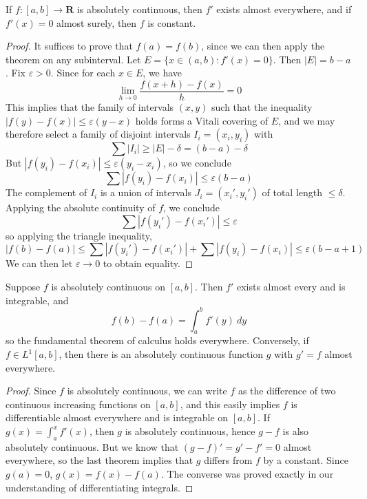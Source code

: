 \begin{theorem}
    If $f: [a,b] \to \mathbf{R}$ is absolutely continuous, then $f'$ exists almost everywhere, and if $f'(x) = 0$ almost surely, then $f$ is constant.
\end{theorem}
\begin{proof}
    It suffices to prove that $f(a) = f(b)$, since we can then apply the theorem on any subinterval. Let $E = \{ x \in (a,b): f'(x) = 0 \}$. Then $|E| = b - a$. Fix $\varepsilon > 0$. Since for each $x \in E$, we have
    \[ \lim_{h \to 0} \frac{f(x+h) - f(x)}{h} = 0 \]
    This implies that the family of intervals $(x,y)$ such that the inequality $|f(y) - f(x)| \leq \varepsilon (y-x)$ holds forms a Vitali covering of $E$, and we may therefore select a family of disjoint intervals $I_i = (x_i,y_i)$ with
    \[ \sum |I_i| \geq |E| - \delta = (b - a) - \delta \]
    But $|f(y_i) - f(x_i)| \leq \varepsilon (y_i - x_i)$, so we conclude
    \[ \sum |f(y_i) - f(x_i)| \leq \varepsilon (b - a) \]
    The complement of $I_i$ is a union of intervals $J_i = (x_i',y_i')$ of total length $\leq \delta$. Applying the absolute continuity of $f$, we conclude
    \[ \sum |f(y_i') - f(x_i')| \leq \varepsilon \]
    so applying the triangle inequality,
    \[ |f(b) - f(a)| \leq \sum |f(y_i') - f(x_i')| + \sum |f(y_i) - f(x_i)| \leq \varepsilon(b - a + 1) \]
    We can then let $\varepsilon \to 0$ to obtain equality.
\end{proof}

\begin{theorem}
    Suppose $f$ is absolutely continuous on $[a,b]$. Then $f'$ exists almost every and is integrable, and
    \[ f(b) - f(a) = \int_a^b f'(y)\ dy \]
    so the fundamental theorem of calculus holds everywhere. Conversely, if $f \in L^1[a,b]$, then there is an absolutely continuous function $g$ with $g' = f$ almost everywhere.
\end{theorem}
\begin{proof}
    Since $f$ is absolutely continuous, we can write $f$ as the difference of two continuous increasing functions on $[a,b]$, and this easily implies $f$ is differentiable almost everywhere and is integrable on $[a,b]$. If $g(x) = \int_a^x f'(x)$, then $g$ is absolutely continuous, hence $g - f$ is also absolutely continuous. But we know that $(g - f)' = g' - f' = 0$ almost everywhere, so the last theorem implies that $g$ differs from $f$ by a constant. Since $g(a) = 0$, $g(x) = f(x) - f(a)$. The converse was proved exactly in our understanding of differentiating integrals.
\end{proof}

